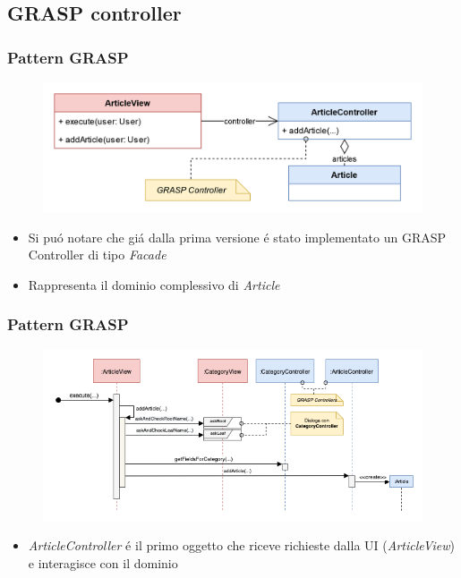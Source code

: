 \subsection{GRASP controller}
\begin{frame}
    \frametitle{Pattern GRASP}
    \begin{figure}
        \includegraphics[width=1\textwidth]{img/MV.png}
    \end{figure}
    \begin{itemize}
        \item Si puó notare che giá dalla prima versione é stato implementato un GRASP Controller di tipo \emph{Facade}
        \item Rappresenta il dominio complessivo di \emph{Article}
    \end{itemize}
\end{frame}

\begin{frame}
    \frametitle{Pattern GRASP}
    \begin{figure}
        \includegraphics[width=1\textwidth]{img/sequenzaGraspController.png}
    \end{figure}
    \begin{itemize}
        \item \emph{ArticleController} é il primo oggetto che riceve richieste dalla UI (\emph{ArticleView}) e interagisce con il dominio
    \end{itemize}
\end{frame}




